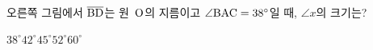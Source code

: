 \noindent\begin{minipage}[t]{0.58\linewidth}\vspace{0pt}\raggedright 오른쪽 그림에서 $\overline{\mathrm{BD}}$는 원~$\mathrm{O}$의 지름이고 $\angle\mathrm{BAC}=38^\circ$일 때, $\angle x$의 크기는?\end{minipage}\hfill\begin{minipage}[t]{0.4\linewidth}\vspace{0pt}\centering \resizebox{\ifdim\width>\linewidth\linewidth\else\width\fi}{!}{}\end{minipage}\par
\begin{choicesii}{$38^\circ$}{$42^\circ$}{$45^\circ$}{$52^\circ$}{$60^\circ$}\end{choicesii}
